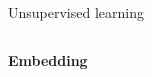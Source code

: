 \documentclass[10pt, compress]{beamer}
\begin{document}
\begin{frame}{Unsupervised learning}
\begin{columns}[T]
    \begin{column}{0.5\textwidth}
      \begin{overlayarea}{\textwidth}{5cm}
        \centering
        \Large \textbf{Embedding} \\ \vspace{10pt}
      \end{overlayarea}
    \end{column}
  \end{columns}
\end{frame}
\end{document}
